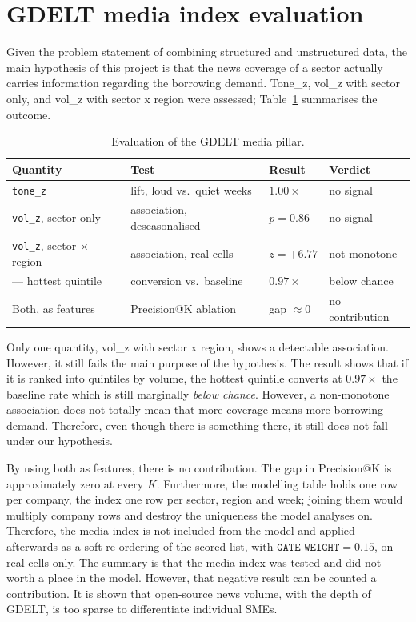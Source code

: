 \documentclass[ %
                    author={Natchalin Iwsakul \\[0.4em] Inkaphol Siriwongwattana \\[0.4em] Tanaphan Kummaraphat \\[0.6em] Patorn Srisupap},,
                supervisor={Fernando Moreno-Pino},
                    degree={MSc},
                     title={Propensity Modelling for SME Commercial Lending Using Open Public Data
},
                  subtitle={Companies House and GDELT as predictors of first-time borrowing},
                      type={},
                      year={2026}]{dissertation}
\begin{document}
\section{GDELT media index evaluation}
\label{sec:eval-media}

Given the problem statement of combining structured and unstructured data, the main hypothesis of this project is that the news coverage of a sector actually carries information regarding the borrowing demand. Tone\_z, vol\_z with sector only, and vol\_z with sector x region were assessed; Table~\ref{tab:media-eval} summarises the outcome.

\begin{table}[h]
\centering\small
\begin{tabular}{@{}llll@{}}
\toprule
\textbf{Quantity} & \textbf{Test} & \textbf{Result} & \textbf{Verdict} \\
\midrule
\texttt{tone\_z} & lift, loud vs.\ quiet weeks & $1.00\times$ & no signal \\
\texttt{vol\_z}, sector only & association, deseasonalised & $p = 0.86$ & no signal \\
\texttt{vol\_z}, sector $\times$ region & association, real cells & $z = +6.77$ & not monotone \\
\quad --- hottest quintile & conversion vs.\ baseline & $0.97\times$ & below chance \\
Both, as features & Precision@K ablation & gap $\approx 0$ & no contribution \\
\bottomrule
\end{tabular}
\caption{Evaluation of the GDELT media pillar.}
\label{tab:media-eval}
\end{table}

Only one quantity, vol\_z with sector x region, shows a detectable association. However, it still fails the main purpose of the hypothesis. The result shows that if it is ranked into quintiles by volume, the hottest quintile converts at $0.97\times$ the baseline rate which is still marginally \textit{below chance}. However, a non-monotone association does not totally mean that more coverage means more borrowing demand. Therefore, even though there is something there, it still does not fall under our hypothesis.

By using both as features, there is no contribution. The gap in Precision@K is
approximately zero at every $K$. Furthermore, the modelling table holds
one row per company, the index one row per sector, region and week; joining them
would multiply company rows and destroy the uniqueness the model analyses on. Therefore, the
media index is not included from the model and applied afterwards as a
soft re-ordering of the scored list, with $\texttt{GATE\_WEIGHT} = 0.15$, on real cells only.
The summary is that the media index was tested and did not worth a place in the model. However, that negative result can be counted a contribution. It is shown that open-source news volume, with the depth of GDELT, is too sparse to differentiate individual SMEs.
\end{document}
